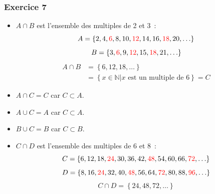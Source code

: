 \documentclass[10pt,notheorems]{beamer}
\newcommand{\red}{\color{red}}
\theoremstyle{plain}
\theoremstyle{definition} %
\begin{document}
\begin{frame}
  \frametitle{Exercice 7}
  \fontsize{8}{10}\selectfont

  \begin{itemize}

  \item $A\cap B$ est l'ensemble des multiples de 2 et 3~:
    \[
      A = \left\{2, 4, {\red 6}, 8, 10, {\red 12}, 14, 16, {\red 18}, 20, \ldots\right\}
    \]
    \[
      B = \left\{3, {\red 6}, 9, {\red 12}, 15, {\red 18}, 21, \ldots\right\}
    \]
    \[
      \begin{split}
        A\cap B &= \left\{6, 12, 18, \ldots\right\}\\
        &= \left\{x\in\mathbb N | x\text{ est un multiple de 6}\right\} = C
      \end{split}
    \]

  \item $A \cap C = C$ car $C \subset A$.\newline

  \item $A \cup C = A$ car $C \subset A$.\newline

  \item $B \cup C = B$ car $C \subset B$.\newline

  \item $C \cap D$  est l'ensemble des multiples de 6 et 8 :
    \[
      C = \left\{6, 12, 18, {\red 24}, 30, 36, 42, {\red 48}, 54, 60, 66, {\red 72}, \ldots\right\}
    \]
    \[
      D = \left\{8, 16, {\red 24}, 32, 40, {\red 48}, 56, 64, {\red 72}, 80, 88, {\red 96}, \ldots\right\}
    \]
    \[
      C\cap D = \left\{24, 48, 72, \ldots\right\}
    \]

  \end{itemize}

\end{frame}
\end{document}
